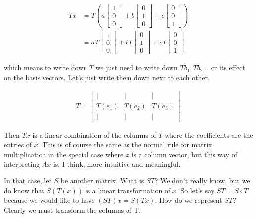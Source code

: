 \documentclass{article}
\begin{document}
\begin{align}
Tx &=
T\left(a
\begin{bmatrix}
1 \\
0 \\
0
\end{bmatrix}
+ b
\begin{bmatrix}
0 \\
1 \\
0
\end{bmatrix}
+ c
\begin{bmatrix}
0 \\
0 \\
1
\end{bmatrix}
\right) \\
&=
aT
\begin{bmatrix}
1 \\
0 \\
0
\end{bmatrix}
+ bT
\begin{bmatrix}
0 \\
1 \\
0
\end{bmatrix}
+ cT
\begin{bmatrix}
0 \\
0 \\
1
\end{bmatrix}
\end{align}

which means to write down $T$ we just need to write down $Tb_1, Tb_2...$ or its effect on the basis vectors. Let's just write them down next to each other.

\begin{align}
T =
\begin{bmatrix}
\vert  & \vert & \vert \\
T(e_1) & T(e_2) & T(e_3) \\
\vert & \vert & \vert
\end{bmatrix}
\end{align}

Then $Tx$ is a linear combination of the columns of $T$ where the coefficients are the entries of $x$. This is of course the same as the normal rule for matrix multiplication in the special case where $x$ is a column vector, but this way of interpreting $Ax$ is, I think, more intuitive and meaningful.

In that case, let $S$ be another matrix. What is $ST$? We don't really know, but we do know that $S(T(x))$ is a linear transformation of $x$. So let's say $ST = S \circ T$ because we would like to have $(ST)x = S(Tx)$. How do we represent $ST$? Clearly we must transform the columns of T.
\end{document}
